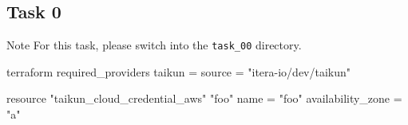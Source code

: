 \subsection{Task 0}
\begin{note}{Note}
For this task, please switch into the \texttt{task\_00} directory.
\end{note}

\blindtext{}

\begin{tf}
terraform {
  required_providers {
    taikun = {
      source = "itera-io/dev/taikun"
    }
  }
}

resource "taikun_cloud_credential_aws" "foo" {
  name = "foo"
  availability_zone = "a"
}
\end{tf}

\blindtext{}
